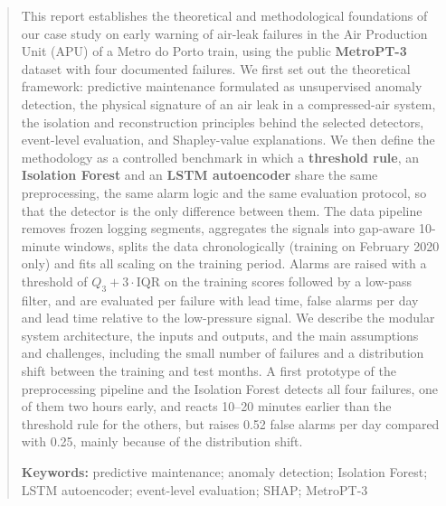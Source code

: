 \begin{abstract}
\noindent This report establishes the theoretical and methodological foundations of our case study on early warning of air-leak failures in the Air Production Unit (APU) of a Metro do Porto train, using the public \textbf{MetroPT-3} dataset with four documented failures. We first set out the theoretical framework: predictive maintenance formulated as unsupervised anomaly detection, the physical signature of an air leak in a compressed-air system, the isolation and reconstruction principles behind the selected detectors, event-level evaluation, and Shapley-value explanations. We then define the methodology as a controlled benchmark in which a \textbf{threshold rule}, an \textbf{Isolation Forest} and an \textbf{LSTM autoencoder} share the same preprocessing, the same alarm logic and the same evaluation protocol, so that the detector is the only difference between them. The data pipeline removes frozen logging segments, aggregates the signals into gap-aware 10-minute windows, splits the data chronologically (training on February 2020 only) and fits all scaling on the training period. Alarms are raised with a threshold of $Q_3 + 3\cdot\mathrm{IQR}$ on the training scores followed by a low-pass filter, and are evaluated per failure with lead time, false alarms per day and lead time relative to the low-pressure signal. We describe the modular system architecture, the inputs and outputs, and the main assumptions and challenges, including the small number of failures and a distribution shift between the training and test months. A first prototype of the preprocessing pipeline and the Isolation Forest detects all four failures, one of them two hours early, and reacts 10--20 minutes earlier than the threshold rule for the others, but raises 0.52 false alarms per day compared with 0.25, mainly because of the distribution shift.

\medskip
\noindent\textbf{Keywords:} predictive maintenance; anomaly detection; Isolation Forest; LSTM autoencoder; event-level evaluation; SHAP; MetroPT-3
\end{abstract}
\clearpage
{\small\tableofcontents
\listoffigures
\listoftables}
\clearpage
